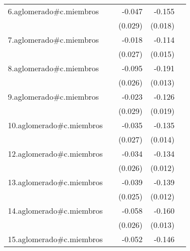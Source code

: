 {\begin{longtable}{l*{4}{D{.}{.}{-1}}}
\addlinespace
6.aglomerado#c.miembros&                     &      -0.047         &      -0.155\sym{***}&                     \\
            &                     &     (0.029)         &     (0.018)         &                     \\
\addlinespace
7.aglomerado#c.miembros&                     &      -0.018         &      -0.114\sym{***}&                     \\
            &                     &     (0.027)         &     (0.015)         &                     \\
\addlinespace
8.aglomerado#c.miembros&                     &      -0.095\sym{***}&      -0.191\sym{***}&                     \\
            &                     &     (0.026)         &     (0.013)         &                     \\
\addlinespace
9.aglomerado#c.miembros&                     &      -0.023         &      -0.126\sym{***}&                     \\
            &                     &     (0.029)         &     (0.019)         &                     \\
\addlinespace
10.aglomerado#c.miembros&                     &      -0.035         &      -0.135\sym{***}&                     \\
            &                     &     (0.027)         &     (0.014)         &                     \\
\addlinespace
12.aglomerado#c.miembros&                     &      -0.034         &      -0.134\sym{***}&                     \\
            &                     &     (0.026)         &     (0.012)         &                     \\
\addlinespace
13.aglomerado#c.miembros&                     &      -0.039         &      -0.139\sym{***}&                     \\
            &                     &     (0.025)         &     (0.012)         &                     \\
\addlinespace
14.aglomerado#c.miembros&                     &      -0.058\sym{*}  &      -0.160\sym{***}&                     \\
            &                     &     (0.026)         &     (0.013)         &                     \\
\addlinespace
15.aglomerado#c.miembros&                     &      -0.052         &      -0.146\sym{***}&                     \\

\end{longtable}}
